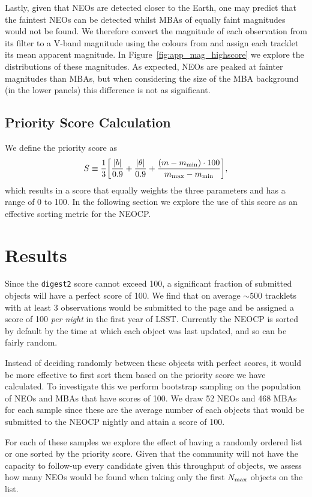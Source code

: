 \documentclass[twocolumn, twocolappendix]{aastex631}
\newcommand{\dig}{\texttt{digest2}}
\begin{document}
Lastly, given that NEOs are detected closer to the Earth, one may predict that the faintest NEOs can be detected whilst MBAs of equally faint magnitudes would not be found. We therefore convert the magnitude of each observation from its filter to a V-band magnitude using the colours from \citet{Jones+2018} and assign each tracklet its mean apparent magnitude. In Figure~\ref{fig:app_mag_highscore} we explore the distributions of these magnitudes. As expected, NEOs are peaked at fainter magnitudes than MBAs, but when considering the size of the MBA background (in the lower panels) this difference is not as significant.

\subsection{Priority Score Calculation}
We define the priority score as
\begin{equation}
    S \equiv \frac{1}{3} \qty[\frac{|b|}{0.9} + \frac{|\theta|}{0.9} + \frac{(m - m_{\rm min}) \cdot 100}{m_{\rm max} - m_{\rm min}}],
\end{equation}
which results in a score that equally weights the three parameters and has a range of 0 to 100. In the following section we explore the use of this score as an effective sorting metric for the NEOCP.

\section{Results}

Since the \dig{} score cannot exceed 100, a significant fraction of submitted objects will have a perfect score of 100. We find that on average ${\sim}500$ tracklets with at least 3 observations would be submitted to the page and be assigned a score of 100 \emph{per night} in the first year of LSST. Currently the NEOCP is sorted by default by the time at which each object was last updated, and so can be fairly random.

Instead of deciding randomly between these objects with perfect scores, it would be more effective to first sort them based on the priority score we have calculated. To investigate this we perform bootstrap sampling on the population of NEOs and MBAs that have scores of 100. We draw 52 NEOs and 468 MBAs for each sample since these are the average number of each objects that would be submitted to the NEOCP nightly and attain a score of 100.

For each of these samples we explore the effect of having a randomly ordered list or one sorted by the priority score. Given that the community will not have the capacity to follow-up every candidate given this throughput of objects, we assess how many NEOs would be found when taking only the first $N_{\rm max}$ objects on the list.
\end{document}
